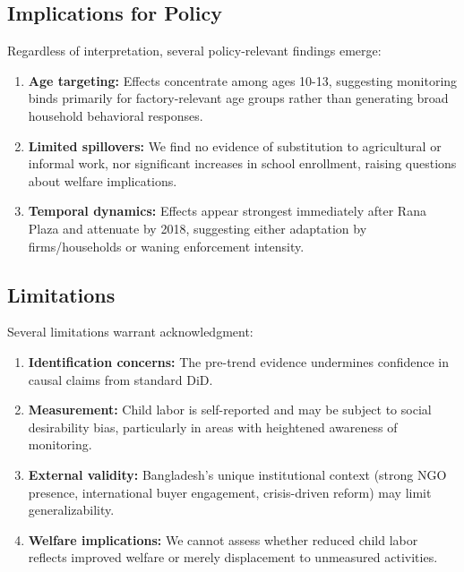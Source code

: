 \subsection{Implications for Policy}

Regardless of interpretation, several policy-relevant findings emerge:

\begin{enumerate}
\item \textbf{Age targeting:} Effects concentrate among ages 10-13, suggesting monitoring binds primarily for factory-relevant age groups rather than generating broad household behavioral responses.

\item \textbf{Limited spillovers:} We find no evidence of substitution to agricultural or informal work, nor significant increases in school enrollment, raising questions about welfare implications.

\item \textbf{Temporal dynamics:} Effects appear strongest immediately after Rana Plaza and attenuate by 2018, suggesting either adaptation by firms/households or waning enforcement intensity.
\end{enumerate}

\subsection{Limitations}

Several limitations warrant acknowledgment:

\begin{enumerate}
\item \textbf{Identification concerns:} The pre-trend evidence undermines confidence in causal claims from standard DiD.

\item \textbf{Measurement:} Child labor is self-reported and may be subject to social desirability bias, particularly in areas with heightened awareness of monitoring.

\item \textbf{External validity:} Bangladesh's unique institutional context (strong NGO presence, international buyer engagement, crisis-driven reform) may limit generalizability.

\item \textbf{Welfare implications:} We cannot assess whether reduced child labor reflects improved welfare or merely displacement to unmeasured activities.
\end{enumerate}

